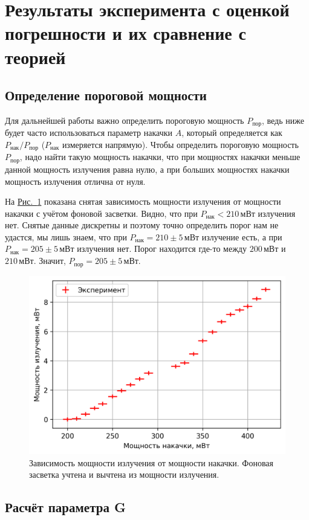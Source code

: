 \documentclass[12pt]{article}
\newcommand*{\figref}[2][]{\hyperref[#2]{Рис.~\ref*{#2}#1}}
\begin{document}
	\section{Результаты эксперимента с оценкой погрешности и их сравнение с теорией}

	\subsection{Определение пороговой мощности}

	Для дальнейшей работы важно определить пороговую мощность $P_\text{пор}$, ведь ниже будет часто использоваться параметр накачки $A$, который определяется как $P_\text{нак} / P_\text{пор}$ ($P_\text{нак}$ измеряется напрямую). Чтобы определить пороговую мощность $P_\text{пор}$, надо найти такую мощность накачки, что при мощностях накачки меньше данной мощность излучения равна нулю, а при больших мощностях накачки мощность излучения отлична от нуля.

	На \figref{fig:p_iz_vs_p_nak} показана снятая зависимость мощности излучения от мощности накачки с учётом фоновой засветки. Видно, что при $P_\text{нак}<210\,\text{мВт}$ излучения нет. Снятые данные дискретны и поэтому точно определить порог нам не удастся, мы лишь знаем, что при $P_\text{нак}=210\pm5\,\text{мВт}$ излучение есть, а при $P_\text{нак}=205\pm5\,\text{мВт}$ излучения нет. Порог находится где-то между $200\,\text{мВт}$ и $210\,\text{мВт}$. Значит, $P_\text{пор} = 205\pm5\,\text{мВт}.$

	\begin{figure}[tb]
		\centering
		\includegraphics[width=.49\textwidth]{../figures/p_iz_vs_p_nak.png}
		\caption{Зависимость мощности излучения от мощности накачки. Фоновая засветка учтена и вычтена из мощности излучения.}
		\label{fig:p_iz_vs_p_nak}
	\end{figure}

	\subsection{Расчёт параметра G}
\end{document}
